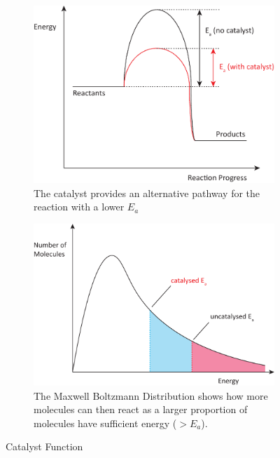 \begin{figure}[h!]
     \centering
     \begin{subfigure}[t]{0.45\textwidth}
         \centering
         \includegraphics[width=\textwidth]{fig/images/catalyst_enthalpy.pdf}
         \caption{The catalyst provides an alternative pathway for the reaction with a lower $E_a$}
         \label{fig:catalyst-enthalpy}
     \end{subfigure}
        \hfill
     \begin{subfigure}[t]{0.45\textwidth}
         \centering
         \includegraphics[width=\textwidth]{fig/images/catalyst_maxwell.pdf}
         \caption{The Maxwell Boltzmann Distribution shows how more molecules can then react as a larger proportion of molecules have sufficient energy ($>E_a$).}
         \label{fig:catalyst-maxwell}
     \end{subfigure}
    \caption{Catalyst Function}
    \label{fig:background_1}
\end{figure}